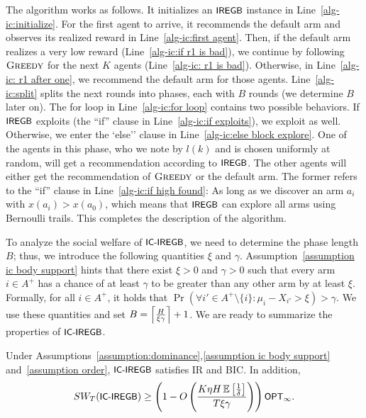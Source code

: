 The algorithm works as follows. It initializes an $\mainalg$ instance in Line~\ref{alg-ic:initialize}. For the first agent to arrive, it recommends the default arm and observes its realized reward in Line~\ref{alg-ic:first agent}. Then, if the default arm realizes a very low reward (Line~\ref{alg-ic:if r1 is bad}), we continue by following $\gre$ for the next $K$ agents (Line~\ref{alg-ic: r1 is bad}). Otherwise, in Line~\ref{alg-ic: r1 after one}, we recommend the default arm for those agents. Line~\ref{alg-ic:split} splits the next rounds into phases, each with $B$ rounds (we determine $B$ later on). The for loop in Line~\ref{alg-ic:for loop} contains two possible behaviors. If $\mainalg$ exploits (the ``if'' clause in Line~\ref{alg-ic:if exploits}), we exploit as well. Otherwise, we enter the `else'' clause in Line~\ref{alg-ic:else block explore}. One of the agents in this phase, who we note by $l(k)$ and is chosen uniformly at random, will get a recommendation according to $\mainalg$. The other agents will either get the recommendation of $\gre$ or the default arm. The former refers to the ``if'' clause in Line~\ref{alg-ic:if high found}: As long as we discover an arm $a_i$ with $x(a_i)>x(a_0)$, which means that $\mainalg$ can explore all arms using Bernoulli trails. This completes the description of the algorithm.





To analyze the social welfare of $\ICSEGB$, we need to determine the phase length $B$; thus, we introduce the following quantities $\xi$ and $\gamma$. Assumption~\ref{assumption ic body support} hints that there exist $\xi>0$ and $\gamma>0$ such that every arm $i \in A^+$ has a chance of at least $\gamma$ to be greater than any other arm by at least $\xi$. Formally, for all $i\in A^+$, it holds that $\Pr(\forall i'\in A^+\setminus \{i\}:\mu_i -X_{i'} > \xi  )>\gamma$. We use these quantities and set $B= \ceil*{\frac{H}{\xi \gamma}}+1$. We are ready to summarize the properties of $\ICSEGB$.
\begin{theorem}\label{theorem: ic fee}
Under Assumptions~\ref{assumption:dominance},\ref{assumption ic body support} and~\ref{assumption order}, $\ICSEGB$ satisfies IR and BIC. In addition,
\[
\mU_T(\ICSEGB) \geq \left(  1-O\left(\frac{K \eta H \E\left[\frac{1}{\delta}\right] }{T \xi \gamma}  \right)\right) \OPT_\infty.
\]
\end{theorem}



